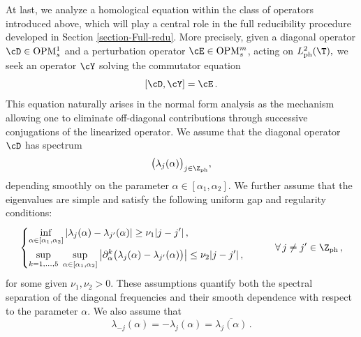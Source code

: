 \documentclass[a4paper,reqno,10pt]{article}
\newcommand{\pa}{\partial}
\newcommand{\OpM}{{\rm O}{\rm P}{\rm M}}
\begin{document}
At last, we analyze a homological equation within the class of operators introduced above, which will play a central role in the full reducibility procedure developed in Section \ref{section-Full-redu}. More precisely, given a diagonal operator $\cD\in \OpM_{s}^{1}$ and a perturbation operator $\cE\in \OpM_{s}^{m}$, acting on $L_{\rm ph}^2(\T),$ we seek an operator $\cY$ solving the commutator equation
\begin{equation}\label{homol.equa}
	[\cD,\cY]=\cE\,.
\end{equation}
This equation naturally arises in the normal form analysis as the mechanism allowing one to eliminate off-diagonal contributions through successive conjugations of the linearized operator.
We assume that the diagonal operator $\cD$ has spectrum
\[
\big(\lambda_j(\alpha)\big)_{j\in\Z_{\rm ph}},
\]
depending smoothly on the parameter $\alpha\in[\alpha_1,\alpha_2]$. We further assume that the eigenvalues are simple and satisfy the following uniform gap and regularity conditions:
\begin{equation}\label{gap.D}
\begin{cases}
\displaystyle 
\inf_{\alpha\in[\alpha_{1},\alpha_{2}]}
|\lambda_{j}(\alpha)-\lambda_{j'}(\alpha)|
\geq
\nu_{1}|j-j'| \,,
\\[0.3cm]
\displaystyle
\sup_{k=1,\dots,5}\;
\sup_{\alpha\in[\alpha_{1},\alpha_{2}]}
\big|
\pa_{\alpha}^{k}
\big(
\lambda_{j}(\alpha)-\lambda_{j'}(\alpha)
\big)
\big|
\leq
\nu_{2}|j-j'| \,,
\\[0.3cm]
\end{cases}
\qquad
\forall\, j\neq j'\in\Z_{\rm ph}\,,
\end{equation}
for some given   $\nu_{1},\nu_{2}>0$. 
These assumptions quantify both the spectral separation of the diagonal frequencies and their smooth dependence with respect to the parameter $\alpha$. We also assume that
\begin{equation}\label{pure.D}
    \lambda_{-j}(\alpha)=-\lambda_{j}(\alpha) = \overline{\lambda_{j}(\alpha)} \,.
\end{equation}
\end{document}

